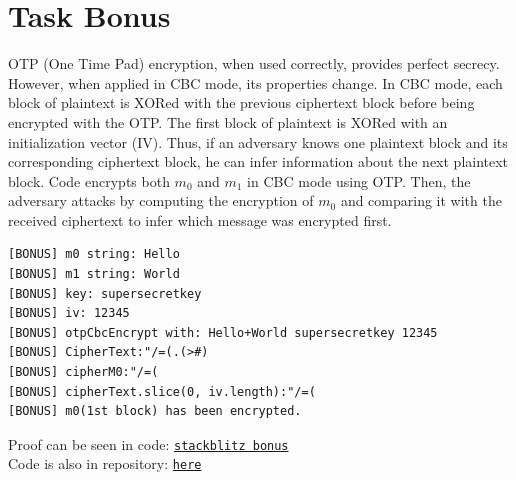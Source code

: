 \documentclass{article}
\begin{document}
\section{Task Bonus}
OTP (One Time Pad) encryption, when used correctly, provides perfect secrecy.
However, when applied in CBC mode, its properties change.
In CBC mode, each block of plaintext is XORed with the previous ciphertext block before being encrypted with the OTP.
The first block of plaintext is XORed with an initialization vector (IV).
Thus, if an adversary knows one plaintext block and its corresponding ciphertext block, he can infer information about the next plaintext block.
Code encrypts both \(m_0\) and \(m_1\) in CBC mode using OTP.
Then, the adversary attacks by computing the encryption of \(m_0\) and
comparing it with the received ciphertext to infer which message was encrypted first.

\begin{verbatim}
[BONUS] m0 string: Hello
[BONUS] m1 string: World
[BONUS] key: supersecretkey
[BONUS] iv: 12345
[BONUS] otpCbcEncrypt with: Hello+World supersecretkey 12345
[BONUS] CipherText:"/=(.(>#)
[BONUS] cipherM0:"/=(
[BONUS] cipherText.slice(0, iv.length):"/=(
[BONUS] m0(1st block) has been encrypted.
\end{verbatim}

Proof can be seen in code: \href{https://stackblitz.com/edit/js-ekqepc?devtoolsheight=80&file=bonus.js&hideDevTools=false}{\texttt{stackblitz bonus}}\\
Code is also in repository: \href{https://github.com/Nurech/js-ekqepc}{\texttt{here}}
\end{document}
